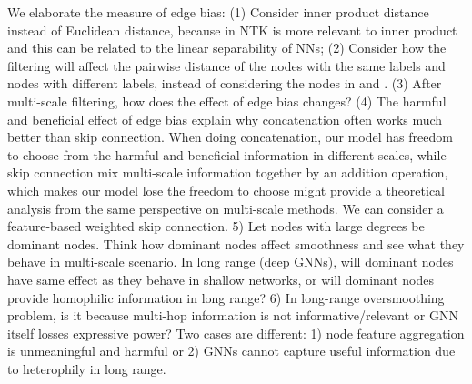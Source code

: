 \documentclass{article}
\newcommand{\0}{{\boldsymbol{0}}}
\newcommand{\6}{{\partial}}
\newcommand{\8}{{\infty}}
\newcommand{\4}{{\nabla}}
\begin{document}
We elaborate the measure of edge bias: (1) Consider inner product distance instead of Euclidean distance, because in NTK is more relevant to inner product and this can be related to the linear separability of NNs; (2) Consider how the filtering will affect the pairwise distance of the nodes with the same labels and nodes with different labels, instead of considering the nodes in  and . (3) After multi-scale filtering, how does the effect of edge bias changes? (4) The harmful and beneficial effect of edge bias explain why concatenation often works much better than skip connection. When doing concatenation, our model has freedom to choose from the harmful and beneficial information in different scales, while skip connection mix multi-scale information together by an addition operation, which makes our model lose the freedom to choose \cite{oono2020optimization} might provide a theoretical analysis from the same perspective on multi-scale methods. We can consider a feature-based weighted skip connection. 5) Let nodes with large degrees be dominant nodes. Think how dominant nodes affect smoothness and see what they behave in multi-scale scenario. In long range (deep GNNs), will dominant nodes have same effect as they behave in shallow networks, or will dominant nodes provide homophilic information in long range? 6) In long-range oversmoothing problem, is it because multi-hop information is not informative/relevant or GNN itself losses expressive power? Two cases are different: 1) node feature aggregation is unmeaningful and harmful or 2) GNNs cannot capture useful information due to heterophily in long range.  
\fi
\end{document}
